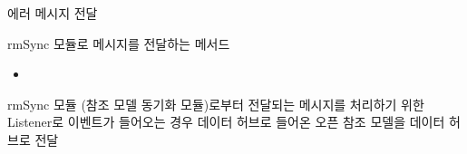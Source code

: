 \documentclass[a4paper,10pt,english]{sphinxmanual}
\begin{document}
\begin{fulllineitems}
\begin{fulllineitems}
\begin{quote}
\begin{description}
\begin{itemize}
\end{itemize}

\end{description}\end{quote}

\end{fulllineitems}


\begin{fulllineitems}
\label{\detokenize{_DHDaemon:DHDaemon._raiseError}}
\pysigstartsignatures
{}
\pysigstopsignatures
\sphinxAtStartPar
에러 메시지 전달

\end{fulllineitems}


\begin{fulllineitems}
\label{\detokenize{_DHDaemon:DHDaemon._rmSyncInit}}
\pysigstartsignatures
{}
\pysigstopsignatures
\sphinxAtStartPar
rmSync 모듈로  메시지를 전달하는 메서드


\nopagebreak

\begin{itemize}
\item {} 
\sphinxAtStartPar
{\hyperref[\detokenize{_RMSync:RMSync._dhDaemonListener}]{}}

\end{itemize}



\end{fulllineitems}


\begin{fulllineitems}
\label{\detokenize{_DHDaemon:DHDaemon._rmSyncListener}}
\pysigstartsignatures
{}
\pysigstopsignatures
\sphinxAtStartPar
rmSync 모듈 (참조 모델 동기화 모듈)로부터 전달되는 메시지를 처리하기 위한 Listener로
 이벤트가 들어오는 경우 데이터 허브로 들어온 오픈 참조 모델을 데이터 허브로 전달



\end{fulllineitems}
\end{fulllineitems}
\end{document}

